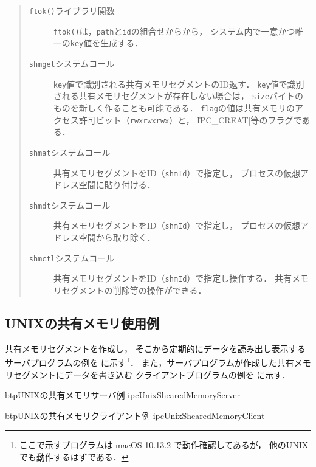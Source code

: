 \begin{quote}
\begin{description}
\item [{\tt ftok()}ライブラリ関数]
{\tt ftok()}は，{\tt path}と{\tt id}の組合せからから，
システム内で一意かつ唯一の{\tt key}値を生成する．

\item [{\tt shmget}システムコール]
{\tt key}値で識別される共有メモリセグメントのID返す．
{\tt key}値で識別される共有メモリセグメントが存在しない場合は，
{\tt size}バイトのものを新しく作ることも可能である．
{\tt flag}の値は共有メモリのアクセス許可ビット（{\tt rwxrwxrwx}）と，
\|IPC_CREAT|等のフラグである．

\item [{\tt shmat}システムコール]
共有メモリセグメントをID（{\tt shmId}）で指定し，
プロセスの仮想アドレス空間に貼り付ける．

\item [{\tt shmdt}システムコール]
共有メモリセグメントをID（{\tt shmId}）で指定し，
プロセスの仮想アドレス空間から取り除く．

\item [{\tt shmctl}システムコール]
共有メモリセグメントをID（{\tt shmId}）で指定し操作する．
共有メモリセグメントの削除等の操作ができる．
\end{description}
\end{quote}

\subsection{UNIXの共有メモリ使用例}
共有メモリセグメントを作成し，
そこから定期的にデータを読み出し表示するサーバプログラムの例を
に示す\footnote{
ここで示すプログラムは macOS 10.13.2 で動作確認してあるが，
他のUNIXでも動作するはずである．}．
また，サーバプログラムが作成した共有メモリセグメントにデータを書き込む
クライアントプログラムの例を
に示す．

\begin{myfig}{btp}{UNIXの共有メモリサーバ例}
{ipcUnixShearedMemoryServer}

\end{myfig}

\begin{myfig}{btp}{UNIXの共有メモリクライアント例}
{ipcUnixShearedMemoryClient}

\end{myfig}

